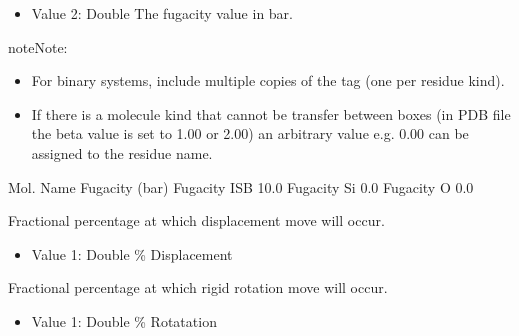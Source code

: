 \documentclass[letterpaper,10pt,english]{sphinxmanual}
\begin{document}
\begin{description}
\begin{itemize}
\item {} 
Value 2: Double \sphinxhyphen{} The fugacity value in bar.

\end{itemize}

\begin{sphinxadmonition}{note}{Note:}\begin{itemize}
\item {} 
For binary systems, include multiple copies of the tag (one per residue kind).

\item {} 
If there is a molecule kind that cannot be transfer between boxes (in PDB file the beta value is set to 1.00 or 2.00) an arbitrary value e.g. 0.00 can be assigned to the residue name.

\end{itemize}
\end{sphinxadmonition}

\begin{sphinxVerbatim}[commandchars=\\\{\}]
\PYGZsh{}\PYGZsh{}\PYGZsh{}\PYGZsh{}\PYGZsh{}\PYGZsh{}\PYGZsh{}\PYGZsh{}\PYGZsh{}\PYGZsh{}\PYGZsh{}\PYGZsh{}\PYGZsh{}\PYGZsh{}\PYGZsh{}\PYGZsh{}\PYGZsh{}\PYGZsh{}\PYGZsh{}\PYGZsh{}\PYGZsh{}\PYGZsh{}\PYGZsh{}\PYGZsh{}\PYGZsh{}\PYGZsh{}\PYGZsh{}\PYGZsh{}\PYGZsh{}\PYGZsh{}\PYGZsh{}\PYGZsh{}\PYGZsh{}
\PYGZsh{} Mol.  Name Fugacity (bar)
\PYGZsh{}\PYGZsh{}\PYGZsh{}\PYGZsh{}\PYGZsh{}\PYGZsh{}\PYGZsh{}\PYGZsh{}\PYGZsh{}\PYGZsh{}\PYGZsh{}\PYGZsh{}\PYGZsh{}\PYGZsh{}\PYGZsh{}\PYGZsh{}\PYGZsh{}\PYGZsh{}\PYGZsh{}\PYGZsh{}\PYGZsh{}\PYGZsh{}\PYGZsh{}\PYGZsh{}\PYGZsh{}\PYGZsh{}\PYGZsh{}\PYGZsh{}\PYGZsh{}\PYGZsh{}\PYGZsh{}\PYGZsh{}\PYGZsh{}
Fugacity  ISB   10.0
Fugacity  Si     0.0
Fugacity  O      0.0
\end{sphinxVerbatim}

\item[{\sphinxcode{\sphinxupquote{DisFreq}}}] \leavevmode
Fractional percentage at which displacement move will occur.
\begin{itemize}
\item {} 
Value 1: Double \sphinxhyphen{} \% Displacement

\end{itemize}

\item[{\sphinxcode{\sphinxupquote{RotFreq}}}] \leavevmode
Fractional percentage at which rigid rotation move will occur.
\begin{itemize}
\item {} 
Value 1: Double \sphinxhyphen{} \% Rotatation


\end{itemize}
\end{description}
\end{document}
